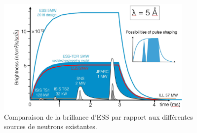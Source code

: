 \begin{figure}[!ht]
  \begin{center}
    \includegraphics[width=0.85\textwidth]{00_French/figures/fig000_ESS_pulse}
  \end{center}
  \caption[]{Comparaison de la brillance d'ESS par rapport aux différentes sources de neutrons existantes.}
  \label{sumfr:fig:ESS_pulse}
\end{figure}
